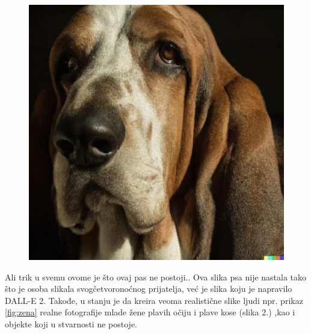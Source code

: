 \documentclass[a4paper]{article}
\begin{document}
\begin{figure}[h!]
\begin{center}
\includegraphics[scale=0.75]{pas.jpg}
\end{center}
\label{fig:pas}
\end{figure}

Ali trik u svemu ovome je što ovaj pas ne postoji.. Ova slika psa nije nastala tako što je osoba slikala svogčetvoronoćnog prijatelja, već je slika koju je napravilo DALL-E 2. Takođe, u stanju je da kreira veoma realistične slike ljudi npr. prikaz \ref{fig:zena}  realne fotografije mlade žene plavih očiju i plave kose (slika 2.) ,kao i objekte koji u stvarnosti ne postoje.
\end{document}
